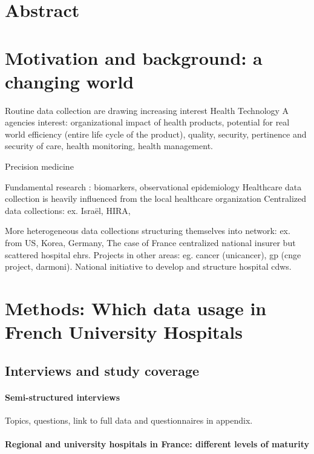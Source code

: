 \documentclass{report}
\begin{document}
\section{Abstract}\label{sec:cdw:abstract}
\section{Motivation and background: a changing world}\label{sec:cdw:motivation}

Routine data collection are drawing increasing interest
Health Technology A agencies interest: organizational impact of health products, potential for real world efficiency (entire life cycle of the product), quality, security, pertinence and security of care, health monitoring, health management.

Precision medicine

Fundamental research : biomarkers, observational epidemiology
Healthcare data collection is heavily influenced from the local healthcare organization
Centralized data collections: ex. Israël, HIRA,

More heterogeneous data collections structuring themselves into network: ex. from US, Korea, Germany,
The case of France
centralized national insurer but scattered hospital ehrs. Projects in other areas: eg. cancer (unicancer), gp (cnge project, darmoni). National initiative to develop and structure hospital cdws.


\section{Methods: Which data usage in French University Hospitals}\label{sec:cdw:methods}

\subsection{Interviews and study coverage}\label{subsec:cdw:interviews}

\paragraph{Semi-structured interviews}

Topics, questions, link to full data and questionnaires in appendix.

\paragraph{Regional and university hospitals in France: different levels of maturity}
\end{document}
